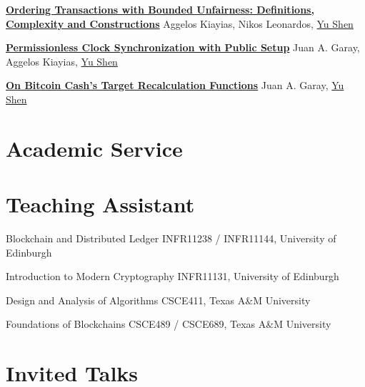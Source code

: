 \documentclass[11pt,a4paper,sans]{moderncv}
\begin{document}
{\textbf{\href{https://eprint.iacr.org/2023/1253.pdf}{Ordering Transactions with Bounded Unfairness: Definitions, Complexity and Constructions}}}
{}
{}
{}
{\normalsize Aggelos Kiayias, Nikos Leonardos, \underline{Yu Shen}}

{\textbf{\href{https://eprint.iacr.org/2022/1220.pdf}{Permissionless Clock Synchronization with Public Setup}}}
{}
{}
{}
{\normalsize Juan A. Garay, Aggelos Kiayias, \underline{Yu Shen}}

{\textbf{\href{https://eprint.iacr.org/2021/143.pdf}{On Bitcoin Cash's Target Recalculation Functions}}}
{}
{}
{}
{\normalsize Juan A. Garay, \underline{Yu Shen}}

\section{Academic Service}


\section{Teaching Assistant}

{Blockchain and Distributed Ledger}
{}
{}
{}
{INFR11238 / INFR11144, University of Edinburgh}

{Introduction to Modern Cryptography}
{}
{}
{}
{INFR11131, University of Edinburgh}

{Design and Analysis of Algorithms}
{}
{}
{}
{CSCE411, Texas A\&M University}

{Foundations of Blockchains}
{}
{}
{}
{CSCE489 / CSCE689, Texas A\&M University
}

\section{Invited Talks}
\end{document}
